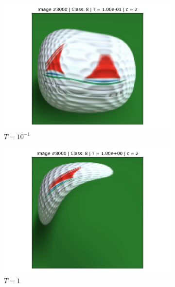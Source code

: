 \begin{figure}[!h]
\begin{subfigure}{0.18\textwidth}
    \includegraphics[width=\textwidth]{ch1-diffy/figures/warping_examples/8000_1_2.png}
    \caption{$T=10^{-1}$}
    \end{subfigure}
    \begin{subfigure}{0.18\textwidth}
    \includegraphics[width=\textwidth]{ch1-diffy/figures/warping_examples/8000_0_2.png}
    \caption{$T=1$}
    \end{subfigure}
    \begin{subfigure}{0.18\textwidth}

\end{subfigure}
\end{figure}
